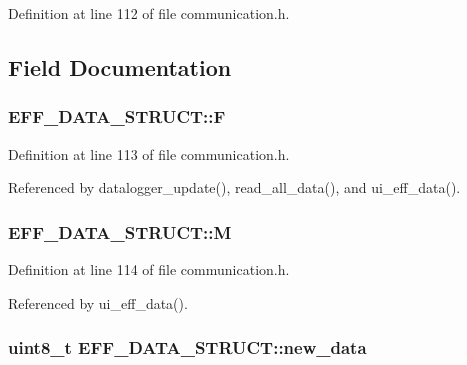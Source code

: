 Definition at line 112 of file communication.\-h.



\subsection{Field Documentation}
\hypertarget{structEFF__DATA__STRUCT_abe8952947b54bf9c247f3429ee3aeb44}{
\subsubsection[{F}]{ E\-F\-F\-\_\-\-D\-A\-T\-A\-\_\-\-S\-T\-R\-U\-C\-T\-::\-F}}\label{structEFF__DATA__STRUCT_abe8952947b54bf9c247f3429ee3aeb44}


Definition at line 113 of file communication.\-h.



Referenced by datalogger\-\_\-update(), read\-\_\-all\-\_\-data(), and ui\-\_\-eff\-\_\-data().

\hypertarget{structEFF__DATA__STRUCT_aaf6e03b6e600295e0f5c706fc869e9d1}{
\subsubsection[{M}]{ E\-F\-F\-\_\-\-D\-A\-T\-A\-\_\-\-S\-T\-R\-U\-C\-T\-::\-M}}\label{structEFF__DATA__STRUCT_aaf6e03b6e600295e0f5c706fc869e9d1}


Definition at line 114 of file communication.\-h.



Referenced by ui\-\_\-eff\-\_\-data().

\hypertarget{structEFF__DATA__STRUCT_aa42ebc512dd79fa6ebf998162a149446}{
\subsubsection[{new\-\_\-data}]{\setlength{\rightskip}{0pt plus 5cm}uint8\-\_\-t E\-F\-F\-\_\-\-D\-A\-T\-A\-\_\-\-S\-T\-R\-U\-C\-T\-::new\-\_\-data}}\label{structEFF__DATA__STRUCT_aa42ebc512dd79fa6ebf998162a149446}


